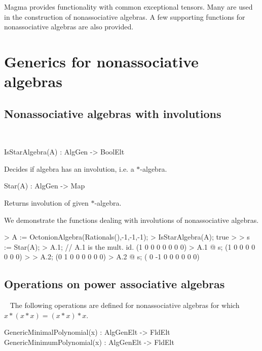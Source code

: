 
Magma provides functionality with common exceptional tensors.  Many are used in the
construction of nonassociative algebras.  A few supporting functions for nonassociative algebras
are also provided.

\section{Generics for nonassociative algebras}

\subsection{Nonassociative algebras with involutions}~

\begin{intrinsics}
IsStarAlgebra(A) : AlgGen -> BoolElt
\end{intrinsics}

Decides if algebra has an involution, i.e. a $*$-algebra.

\begin{intrinsics}
Star(A) : AlgGen -> Map
\end{intrinsics}

Returns involution of given $*$-algebra.

\begin{example}
We demonstrate the functions dealing with involutions of nonassociative algebras.

\begin{code}
> A := OctonionAlgebra(Rationals(),-1,-1,-1);
> IsStarAlgebra(A);
true
> 
> s := Star(A);
> A.1; // A.1 is the mult. id.
(1 0 0 0 0 0 0 0)
> A.1 @ s; 
(1 0 0 0 0 0 0 0)
> 
> A.2;
(0 1 0 0 0 0 0 0)
> A.2 @ s;
( 0 -1  0  0  0  0  0  0)
\end{code}
\end{example}

\subsection{Operations on power associative algebras}~
The following operations are defined for nonassociative algebras for which $x*(x*x)=(x*x)*x$.

\begin{intrinsics}
GenericMinimalPolynomial(x) : AlgGenElt -> FldElt
GenericMinimumPolynomial(x) : AlgGenElt -> FldElt
\end{intrinsics}

